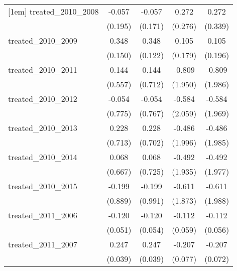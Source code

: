 {\begin{tabular}{l*{4}{c}}
[1em]
treated\_2010\_2008&      -0.057         &      -0.057         &       0.272         &       0.272         \\
            &     (0.195)         &     (0.171)         &     (0.276)         &     (0.339)         \\
[1em]
treated\_2010\_2009&       0.348\sym{*}  &       0.348\sym{**} &       0.105         &       0.105         \\
            &     (0.150)         &     (0.122)         &     (0.179)         &     (0.196)         \\
[1em]
treated\_2010\_2011&       0.144         &       0.144         &      -0.809         &      -0.809         \\
            &     (0.557)         &     (0.712)         &     (1.950)         &     (1.986)         \\
[1em]
treated\_2010\_2012&      -0.054         &      -0.054         &      -0.584         &      -0.584         \\
            &     (0.775)         &     (0.767)         &     (2.059)         &     (1.969)         \\
[1em]
treated\_2010\_2013&       0.228         &       0.228         &      -0.486         &      -0.486         \\
            &     (0.713)         &     (0.702)         &     (1.996)         &     (1.985)         \\
[1em]
treated\_2010\_2014&       0.068         &       0.068         &      -0.492         &      -0.492         \\
            &     (0.667)         &     (0.725)         &     (1.935)         &     (1.977)         \\
[1em]
treated\_2010\_2015&      -0.199         &      -0.199         &      -0.611         &      -0.611         \\
            &     (0.889)         &     (0.991)         &     (1.873)         &     (1.988)         \\
[1em]
treated\_2011\_2006&      -0.120\sym{*}  &      -0.120\sym{*}  &      -0.112         &      -0.112\sym{*}  \\
            &     (0.051)         &     (0.054)         &     (0.059)         &     (0.056)         \\
[1em]
treated\_2011\_2007&       0.247\sym{***}&       0.247\sym{***}&      -0.207\sym{**} &      -0.207\sym{**} \\
            &     (0.039)         &     (0.039)         &     (0.077)         &     (0.072)         \\

\end{tabular}}
